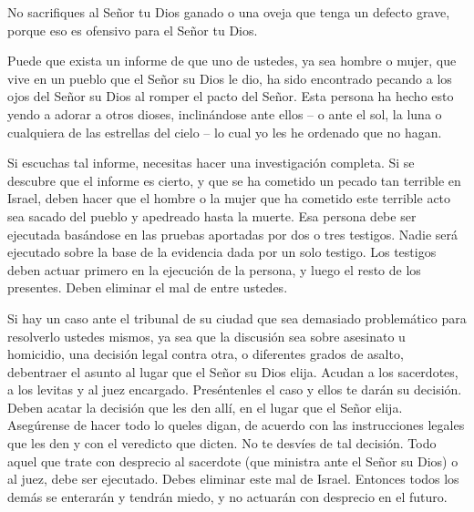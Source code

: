  No sacrifiques al Señor tu Dios ganado o una oveja que
tenga un defecto grave, porque eso es ofensivo para el Señor tu Dios.

 Puede que exista un informe de que uno de ustedes, ya sea
hombre o mujer, que vive en un pueblo que el Señor su Dios le dio, ha
sido encontrado pecando a los ojos del Señor su Dios al romper el pacto
del Señor.  Esta persona ha hecho esto yendo a adorar a
otros dioses, inclinándose ante ellos -- o ante el sol, la luna o
cualquiera de las estrellas del cielo -- lo cual yo les he ordenado que
no hagan.

 Si escuchas tal informe, necesitas hacer una investigación
completa. Si se descubre que el informe es cierto, y que se ha cometido
un pecado tan terrible en Israel,  deben hacer que el hombre
o la mujer que ha cometido este terrible acto sea sacado del pueblo y
apedreado hasta la muerte.  Esa persona debe ser ejecutada
basándose en las pruebas aportadas por dos o tres testigos. Nadie será
ejecutado sobre la base de la evidencia dada por un solo testigo.
 Los testigos deben actuar primero en la ejecución de la
persona, y luego el resto de los presentes. Deben eliminar el mal de
entre ustedes.

 Si hay un caso ante el tribunal de su ciudad que sea
demasiado problemático para resolverlo ustedes mismos, ya sea que la
discusión sea sobre asesinato u homicidio, una decisión legal contra
otra, o diferentes grados de asalto, debentraer el asunto al lugar que
el Señor su Dios elija.  Acudan a los sacerdotes, a los
levitas y al juez encargado. Preséntenles el caso y ellos te darán su
decisión.  Deben acatar la decisión que les den allí, en el
lugar que el Señor elija. Asegúrense de hacer todo lo queles digan,
 de acuerdo con las instrucciones legales que les den y con
el veredicto que dicten. No te desvíes de tal decisión. 
Todo aquel que trate con desprecio al sacerdote (que ministra ante el
Señor su Dios) o al juez, debe ser ejecutado. Debes eliminar este mal de
Israel.  Entonces todos los demás se enterarán y tendrán
miedo, y no actuarán con desprecio en el futuro.

